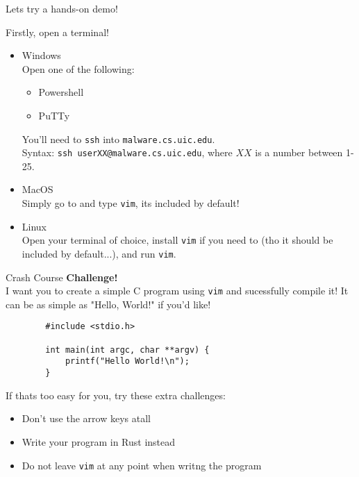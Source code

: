 \documentclass{beamer}
\begin{document}
\begin{frame}
	Lets try a hands-on demo!
	\pause

	Firstly, open a terminal!
	\begin{itemize}
		\item Windows\\
			Open one of the following:
			\begin{itemize}
				\item Powershell
				\item PuTTy
			\end{itemize}
			You'll need to \texttt{ssh} into
			\texttt{malware.cs.uic.edu}.\\
			Syntax: \texttt{ssh userXX@malware.cs.uic.edu}, where
			$XX$ is a number between 1-25.
		\item MacOS\\
			Simply go to  and
			type \texttt{vim}, its included by default!
		\item Linux\\
			Open your terminal of choice, install \texttt{vim} if
			you need to (tho it should be included by default...),
			and run \texttt{vim}.
	\end{itemize}
\end{frame}

\begin{frame}[fragile]{Crash Course}
	\textbf{Challenge!}\\
	I want you to create a simple C program using \texttt{vim} and
	sucessfully compile it! It can be as simple as "Hello, World!" if you'd
	like!

	\begin{verbatim}
		#include <stdio.h>

		int main(int argc, char **argv) {
			printf("Hello World!\n");
		}
	\end{verbatim}

	If thats too easy for you, try these extra challenges:
	\begin{itemize}
		\item Don't use the arrow keys atall
		\item Write your program in Rust instead
		\item Do not leave \texttt{vim} at any point when writng the
			program
	\end{itemize}
\end{frame}
\end{document}

